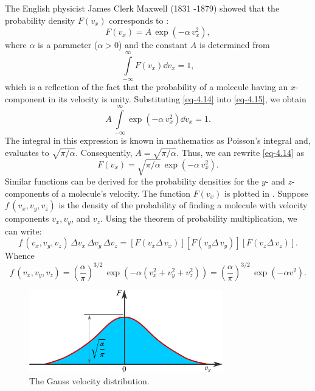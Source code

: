 The English physicist James Clerk Maxwell (1831 -1879) showed that
the	probability	density	 $F  (v_{x})$ corresponds	to :
\begin{equation}%
F (v_{x}) = A \, \exp (- \alpha \, v_{x}^{2}),
\label{eq-4.14}
\end{equation}
where $\alpha$ is a parameter ($\alpha > 0$) and the constant $A$ is determined from
\begin{equation}%
\int\limits_{- \infty}^{\infty} F (v_{x}) \dd v_{x} = 1,
\label{eq-4.15}
\end{equation}
which is a reflection of the fact that the probability of a molecule having
an $x$-component in its velocity is unity. Substituting \eqref{eq-4.14} into \eqref{eq-4.15}, we obtain
\begin{equation*}%
A \, \int\limits_{- \infty}^{\infty} \exp (- \alpha \, v_{x}^{2}) \dd v_{x} = 1.
\label{gauss-law-param}
\end{equation*}
The integral in this expression is known in mathematics as Poisson's integral and, evaluates to $\sqrt{\pi / \alpha}$. Consequently, $ A = \sqrt{\pi / \alpha}$. Thus, we can rewrite \eqref{eq-4.14} as 
\begin{equation}%
F (v_{x})  = \sqrt{\pi / \alpha} \, \exp (- \alpha \, v_{x}^{2}).
\label{eq-4.16}
\end{equation}
Similar functions can be derived for the probability densities for the $y$- and $z$-components of a molecule's velocity. The function $F(v_{x} )$ is plotted in . Suppose $f \,(v_{x}, v_{y}, v_{z})$ is the density of the probability of finding a molecule with velocity components $v_{x}, v_{y}$, and $v_{z}$. Using the theorem of probability multiplication, we can write:
\begin{equation*}%
f \, (v_{x}, v_{y}, v_{z}) \, \Delta v_{x}\, \Delta  v_{y} \, \Delta v_{z} = [F(v_{x} \Delta \, v_{x})] [F(v_{y} \Delta \, v_{y})][F(v_{z} \Delta \, v_{z})].
\end{equation*}
Whence
\begin{equation}
f \, (v_{x}, v_{y}, v_{z}) = \left(\frac{\alpha}{\pi} \right) ^{3/2} \, \exp (- \alpha (v_{x}^{2}+ v_{y}^{2} + v_{z}^{2})) = \left(\frac{\alpha}{\pi} \right) ^{3/2} \, \exp(- \alpha v^{2}).
\label{eq-4.17}
\end{equation}

\begin{figure}[!ht]
\centering
\includegraphics[width=0.75\textwidth]{figures/maxwl-dist1.pdf}
\caption{The Gauss velocity distribution.\label{gauss-dist}}
\end{figure}



